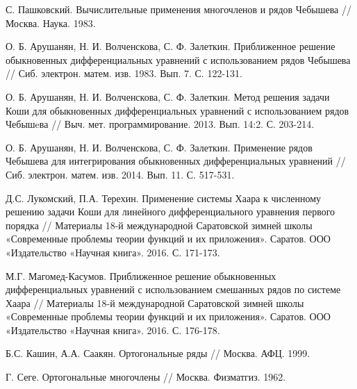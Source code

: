 \begin{thebibliography}{999}

 С. Пашковский. Вычислительные применения многочленов и рядов Чебышева // Москва. Наука. 1983.




 О. Б. Арушанян, Н. И. Волченскова, С. Ф. Залеткин. Приближенное решение обыкновенных дифференциальных уравнений с использованием рядов Чебышева // Сиб. электрон. матем. изв. 1983. Вып. 7. С. 122-131.




 О. Б. Арушанян, Н. И. Волченскова, С. Ф. Залеткин. Метод решения задачи Коши для обыкновенных дифференциальных уравнений с использованием рядов Чебышeва // Выч. мет. программирование. 2013. Вып. 14:2. С. 203-214.




 О. Б. Арушанян, Н. И. Волченскова, С. Ф. Залеткин. Применение рядов Чебышева для интегрирования обыкновенных дифференциальных уравнений // Сиб. электрон. матем. изв. 2014. Вып. 11. С. 517-531.




 Д.С. Лукомский, П.А. Терехин. Применение системы Хаара к численному решению задачи Коши для линейного дифференциального уравнения первого порядка // Материалы 18-й международной Саратовской зимней школы «Современные проблемы теории функций и их приложения». Саратов. ООО «Издательство «Научная книга». 2016. С. 171-173.




 М.Г. Магомед-Касумов. Приближенное решение обыкновенных дифференциальных уравнений с использованием смешанных рядов по системе Хаара // Материалы 18-й международной Саратовской зимней школы «Современные проблемы теории функций и их приложения». Саратов. ООО «Издательство «Научная книга». 2016. С. 176-178.




 Б.С. Кашин, А.А. Саакян. Ортогональные ряды // Москва. АФЦ. 1999.




 Г. Сеге. Ортогональные многочлены // Москва. Физматгиз. 1962.




\end{thebibliography}
